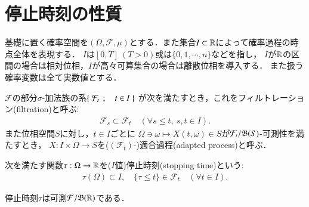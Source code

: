 \section{停止時刻の性質}
	基礎に置く確率空間を$(\Omega,\mathcal{F},\mu)$とする．また集合$I \subset \mathbb{R}$によって確率過程の時点全体を表現する．
	$I$は$[0,T]\ (T > 0)$或は$\{0,1,\cdots,n\}$などを指し，
	$I$が$\mathbb{R}$の区間の場合は相対位相，$I$が高々可算集合の場合は離散位相を導入する．
	また扱う確率変数は全て実数値とする．
	\begin{screen}
		\begin{dfn}
			$\mathcal{F}$の部分$\sigma$-加法族の系$\left\{\ \mathcal{F}_t\ \, ; \quad t \in I\ \right\}$
			が次を満たすとき，これをフィルトレーション(filtration)と呼ぶ:
			\begin{align}
				\mathcal{F}_s \subset \mathcal{F}_t
				\quad (\forall s \leq t,\ s,t \in I).
			\end{align}
			また位相空間$S$に対し，$t \in I$ごとに
			$\Omega \ni \omega \longmapsto X(t,\omega) \in S$が$\mathcal{F}_t/\mathfrak{B}(S)$-可測性を満たすとき，
			$X:I \times \Omega \rightarrow S$を($(\mathcal{F}_t)$-)適合過程(adapted process)と呼ぶ．
		\end{dfn}
	\end{screen}
	
	\begin{screen}
		\begin{dfn}[停止時刻]
			次を満たす関数$\tau:\Omega \rightarrow \mathbb{R}$を($I$値)停止時刻(stopping time)という:
			\begin{align}
				\tau(\Omega) \subset I,
				\quad \{ \tau \leq t \} \in \mathcal{F}_t \quad (\forall t \in I).
			\end{align}
		\end{dfn}
	\end{screen}
	
	\begin{screen}
		\begin{thm}[停止時刻は可測写像]
			停止時刻$\tau$は可測$\mathcal{F}/\mathfrak{B}(\mathbb{R})$である．
		\end{thm}
	\end{screen}
	
